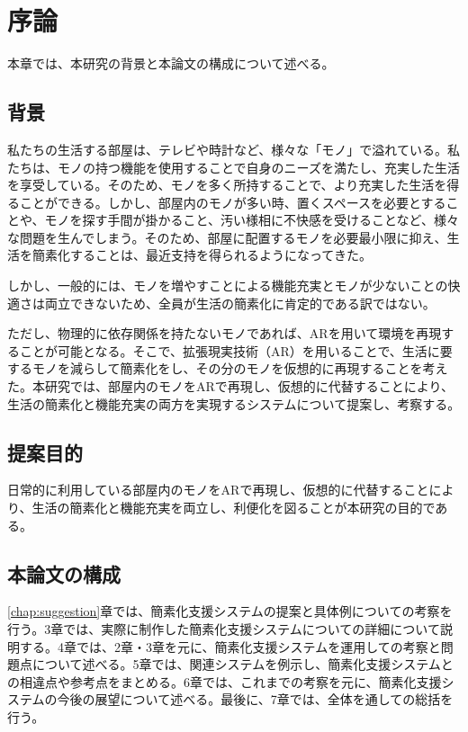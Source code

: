 \chapter{序論}
\label{chap:introduction}

本章では、本研究の背景と本論文の構成について述べる。

\newpage

\section{背景}

私たちの生活する部屋は、テレビや時計など、様々な「モノ」で溢れている。私たちは、モノの持つ機能を使用することで自身のニーズを満たし、充実した生活を享受している。そのため、モノを多く所持することで、より充実した生活を得ることができる。しかし、部屋内のモノが多い時、置くスペースを必要とすることや、モノを探す手間が掛かること、汚い様相に不快感を受けることなど、様々な問題を生んでしまう。そのため、部屋に配置するモノを必要最小限に抑え、生活を簡素化することは、最近支持を得られるようになってきた。

しかし、一般的には、モノを増やすことによる機能充実とモノが少ないことの快適さは両立できないため、全員が生活の簡素化に肯定的である訳ではない。

ただし、物理的に依存関係を持たないモノであれば、ARを用いて環境を再現することが可能となる。そこで、拡張現実技術（AR）を用いることで、生活に要するモノを減らして簡素化をし、その分のモノを仮想的に再現することを考えた。本研究では、部屋内のモノをARで再現し、仮想的に代替することにより、生活の簡素化と機能充実の両方を実現するシステムについて提案し、考察する。

\section{提案目的}

日常的に利用している部屋内のモノをARで再現し、仮想的に代替することにより、生活の簡素化と機能充実を両立し、利便化を図ることが本研究の目的である。

\section{本論文の構成}

\ref{chap:suggestion}章では、簡素化支援システムの提案と具体例についての考察を行う。3章では、実際に制作した簡素化支援システムについての詳細について説明する。4章では、2章・3章を元に、簡素化支援システムを運用しての考察と問題点について述べる。5章では、関連システムを例示し、簡素化支援システムとの相違点や参考点をまとめる。6章では、これまでの考察を元に、簡素化支援システムの今後の展望について述べる。最後に、7章では、全体を通しての総括を行う。
